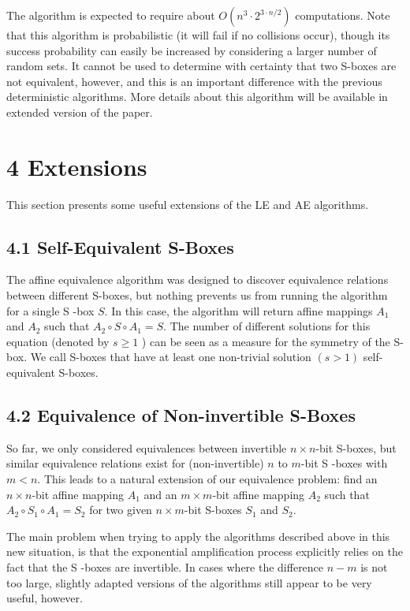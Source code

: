 \documentclass[10pt]{article}
\begin{document}
The algorithm is expected to require about $O\left(n^{3} \cdot 2^{3 \cdot n / 2}\right)$ computations. Note that this algorithm is probabilistic (it will fail if no collisions occur), though its success probability can easily be increased by considering a larger number of random sets. It cannot be used to determine with certainty that two S-boxes are not equivalent, however, and this is an important difference with the previous deterministic algorithms. More details about this algorithm will be available in extended version of the paper.

\section*{4 Extensions}
This section presents some useful extensions of the LE and AE algorithms.

\subsection*{4.1 Self-Equivalent S-Boxes}
The affine equivalence algorithm was designed to discover equivalence relations between different S-boxes, but nothing prevents us from running the algorithm for a single S -box $S$. In this case, the algorithm will return affine mappings $A_{1}$ and $A_{2}$ such that $A_{2} \circ S \circ A_{1}=S$. The number of different solutions for this equation (denoted by $s \geq 1$ ) can be seen as a measure for the symmetry of the S-box. We call S-boxes that have at least one non-trivial solution $(s>1)$ self-equivalent S-boxes.

\subsection*{4.2 Equivalence of Non-invertible S-Boxes}
So far, we only considered equivalences between invertible $n \times n$-bit S-boxes, but similar equivalence relations exist for (non-invertible) $n$ to $m$-bit S -boxes with $m<n$. This leads to a natural extension of our equivalence problem: find an $n \times n$-bit affine mapping $A_{1}$ and an $m \times m$-bit affine mapping $A_{2}$ such that $A_{2} \circ S_{1} \circ A_{1}=S_{2}$ for two given $n \times m$-bit S-boxes $S_{1}$ and $S_{2}$.

The main problem when trying to apply the algorithms described above in this new situation, is that the exponential amplification process explicitly relies on the fact that the S -boxes are invertible. In cases where the difference $n-m$ is not too large, slightly adapted versions of the algorithms still appear to be very useful, however.
\end{document}
